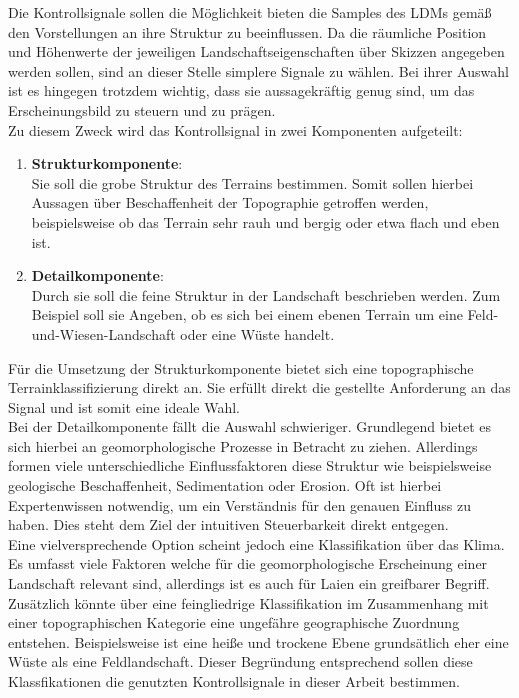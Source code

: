 Die Kontrollsignale sollen die Möglichkeit bieten die Samples des \ac{LDM}s gemäß den Vorstellungen an ihre Struktur zu beeinflussen. Da die räumliche Position und Höhenwerte der jeweiligen Landschaftseigenschaften über Skizzen angegeben werden sollen, sind an dieser Stelle simplere Signale zu wählen. Bei ihrer Auswahl ist es hingegen trotzdem wichtig, dass sie aussagekräftig genug  sind, um das Erscheinungsbild zu steuern und zu prägen. \\
Zu diesem Zweck wird das Kontrollsignal in zwei Komponenten aufgeteilt:
\begin{enumerate}
    \item \textbf{Strukturkomponente}: \\
    Sie soll die grobe Struktur des Terrains bestimmen. Somit sollen hierbei Aussagen über Beschaffenheit der Topographie getroffen werden, beispielsweise ob das Terrain sehr rauh und bergig oder etwa flach und eben ist. 
    \item \textbf{Detailkomponente}: \\
    Durch sie soll die feine Struktur in der Landschaft beschrieben werden. Zum Beispiel soll sie Angeben, ob es sich bei einem ebenen Terrain um eine Feld-und-Wiesen-Landschaft oder eine Wüste handelt. 
\end{enumerate}
Für die Umsetzung der Strukturkomponente bietet sich eine topographische Terrainklassifizierung direkt an. Sie erfüllt direkt die gestellte Anforderung an das Signal und ist somit eine ideale Wahl. \\
Bei der Detailkomponente fällt die Auswahl schwieriger. Grundlegend bietet es sich hierbei an geomorphologische Prozesse in Betracht zu ziehen. Allerdings formen viele unterschiedliche Einflussfaktoren diese Struktur wie beispielsweise geologische Beschaffenheit, Sedimentation oder Erosion. Oft ist hierbei Expertenwissen notwendig, um ein Verständnis für den genauen Einfluss zu haben. Dies steht dem Ziel der intuitiven Steuerbarkeit direkt entgegen. \\
Eine vielversprechende Option scheint jedoch eine Klassifikation über das Klima. Es umfasst viele Faktoren welche für die geomorphologische Erscheinung einer Landschaft relevant sind, allerdings ist es auch für Laien ein greifbarer Begriff. Zusätzlich könnte über eine feingliedrige Klassifikation im Zusammenhang mit einer topographischen Kategorie eine ungefähre geographische Zuordnung entstehen. Beispielsweise ist eine heiße und trockene Ebene grundsätlich eher eine Wüste als eine Feldlandschaft. Dieser Begründung entsprechend sollen diese Klassfikationen die genutzten Kontrollsignale in dieser Arbeit bestimmen.  


